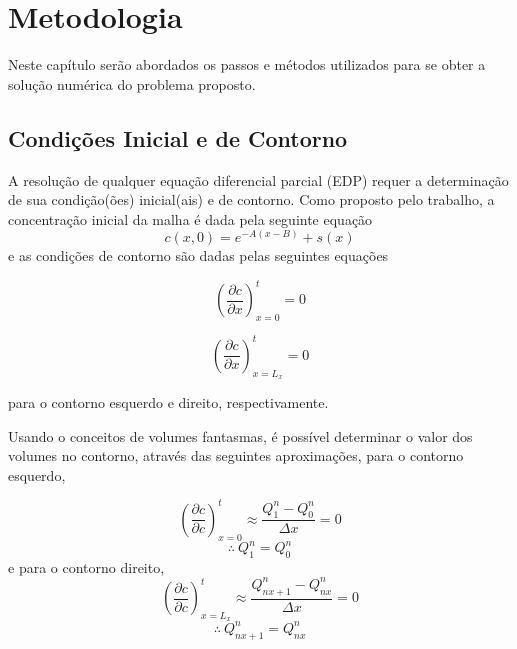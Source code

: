 \chapter{Metodologia}
Neste capítulo serão abordados os passos e métodos utilizados para se
obter a solução numérica do problema proposto.

\section{Condições Inicial e de Contorno}
A resolução de qualquer equação diferencial parcial (EDP) requer a
determinação de sua condição(ões) inicial(ais) e de contorno. Como
proposto pelo trabalho, a concentração inicial da malha é dada pela
seguinte equação
\begin{equation}
    c(x,0) = e^{-A(x - B)} + s(x)
\end{equation}
e as condições de contorno são dadas pelas seguintes equações

\medskip
\noindent
\begin{minipage}{.5\linewidth}
    \begin{equation}
        \left( \frac{\partial c}{\partial x} \right)_{x=0}^t = 0
    \end{equation}
\end{minipage}%
\begin{minipage}{.5\linewidth}
    \begin{equation}
        \left( \frac{\partial c}{\partial x} \right)_{x=L_x}^t = 0
    \end{equation}
\end{minipage}

\medskip
\noindent para o contorno esquerdo e direito, respectivamente.

Usando o conceitos de volumes fantasmas, é possível determinar o valor dos
volumes no contorno, através das seguintes aproximações, para o contorno
esquerdo,

\[
    \left(\frac{\partial c}{\partial c}\right)_{x=0}^t
    \approx
    \frac{Q_1^n - Q_0^n}{\Delta x} = 0
\]
\begin{equation}
    \therefore\ Q_1^n = Q_0^n
\end{equation}
e para o contorno direito,
\[
    \left(\frac{\partial c}{\partial c}\right)_{x=L_x}^t
    \approx
    \frac{Q_{nx+1}^n - Q_{nx}^n}{\Delta x} = 0
\]
\begin{equation}
    \therefore\ Q_{nx+1}^n = Q_{nx}^n
\end{equation}


